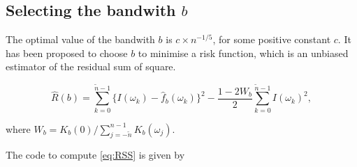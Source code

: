 \documentclass{article}\usepackage[]{graphicx}\usepackage[]{color}
\begin{document}
\subsection{Selecting the bandwith $b$}
The optimal value of the bandwith $b$ is $c \times n^{-1/5}$, for some positive constant $c$. It has been proposed to choose $b$ to minimise a risk function, which is an unbiased estimator of the residual sum of square.

\begin{equation}
\label{eq:RSS}
\hat{R}(b) = \sum_{k = 0}^{\tilde{n} - 1} \Big\{  I(\omega_k)  - \hat{f}_b(\omega_k)\Big\}^2 - \dfrac{1 - 2W_b}{2} \sum_{k = 0}^{\tilde{n} - 1} I(\omega_k)^2,
\end{equation}

where $W_b = K_b(0)/\sum_{j = -\tilde{n}}^{n - 1} K_b(\omega_j)$.

The code to compute \ref{eq:RSS} is given by
\end{document}
